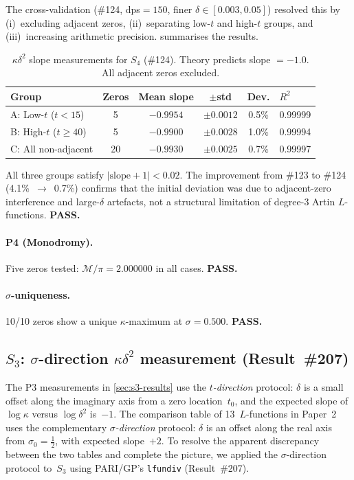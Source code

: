 \documentclass[11pt, a4paper]{article}
\theoremstyle{plain}
\theoremstyle{definition}
\newcommand{\abs}[1]{\left|#1\right|}
\newcommand{\kap}{\kappa}             %
\newcommand{\mono}{\mathcal{M}}       %
\begin{document}
The cross-validation (\#124, dps${}=150$, finer
$\delta \in [0.003, 0.05]$) resolved this by (i)~excluding adjacent
zeros, (ii)~separating low-$t$ and high-$t$ groups, and
(iii)~increasing arithmetic precision.  
summarises the results.

\begin{table}[ht]
\centering
\caption{$\kap\delta^{2}$ slope measurements for $S_{4}$ (\#124).
  Theory predicts slope $= -1.0$.  All adjacent zeros excluded.}
\label{tab:s4-kappa}
\begin{tabular}{@{}lccccl@{}}
\toprule
\textbf{Group} & \textbf{Zeros} & \textbf{Mean slope} & $\pm$\textbf{std}
  & \textbf{Dev.} & $R^{2}$ \\
\midrule
A: Low-$t$ ($t < 15$) & 5 & $-0.9954$ & $\pm0.0012$ & 0.5\% & 0.99999 \\
B: High-$t$ ($t \ge 40$) & 5 & $-0.9900$ & $\pm0.0028$ & 1.0\% & 0.99994 \\
C: All non-adjacent & 20 & $-0.9930$ & $\pm0.0025$ & 0.7\% & 0.99997 \\
\bottomrule
\end{tabular}
\end{table}

All three groups satisfy $\abs{\text{slope}+1} < 0.02$.  The
improvement from \#123 to \#124 (4.1\%~$\to$~0.7\%) confirms that the
initial deviation was due to adjacent-zero interference and large-$\delta$
artefacts, not a structural limitation of degree-3 Artin $L$-functions.
\textbf{PASS.}

\paragraph{P4 (Monodromy).}
Five zeros tested: $\mono/\pi = 2.000000$ in all cases.
\textbf{PASS.}

\paragraph{$\sigma$-uniqueness.}
10/10 zeros show a unique $\kap$-maximum at $\sigma = 0.500$.
\textbf{PASS.}


\subsection{$S_{3}$: $\sigma$-direction $\kap\delta^{2}$ measurement (Result~\#207)}
\label{sec:s3-sigma}

The P3 measurements in \cref{sec:s3-results} use the \emph{$t$-direction}
protocol: $\delta$ is a small offset along the imaginary axis from a zero
location~$t_{0}$, and the expected slope of $\log\kap$ versus
$\log\delta^{2}$ is~$-1$.  The comparison table of 13~$L$-functions in
Paper~2 uses the complementary \emph{$\sigma$-direction} protocol:
$\delta$ is an offset along the real axis from $\sigma_{0}=\tfrac{1}{2}$,
with expected slope~$+2$.  To resolve the apparent discrepancy between
the two tables and complete the picture, we applied the $\sigma$-direction
protocol to~$S_{3}$ using PARI/GP's \texttt{lfundiv} (Result~\#207).
\end{document}
